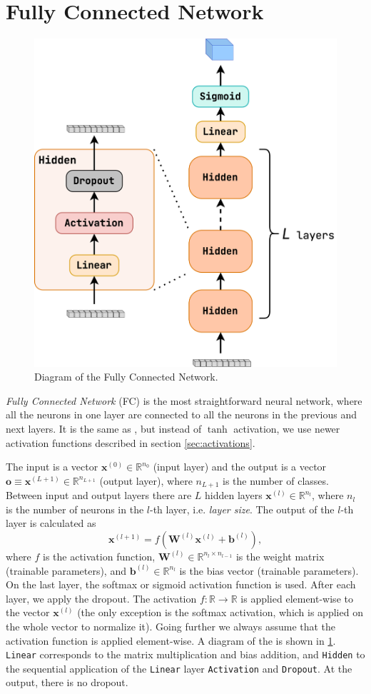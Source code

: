 \section{Fully Connected Network}
\label{sec:fc}
\begin{figure}[htb]
    \centering
    \includegraphics[width=0.6\linewidth]{src/diagrams/fc.png}
    \caption{Diagram of the Fully Connected Network.}
    \label{fig:fc}
\end{figure}

\emph{Fully Connected Network} (FC) \cite{mlp} is the most straightforward neural network, where all the neurons in one layer are connected to all the neurons in the previous and next layers.
It is the same as \mlp \cite{mlp}, but instead of $\tanh$ activation, we use newer activation functions described in section \ref{sec:activations}.

The input is a vector $\pmb{x}^{(0)} \in \mathbb{R}^{n_0}$ (input layer) and the output is a vector $\pmb{o} \equiv \pmb{x}^{(L + 1)} \in \mathbb{R}^{n_{L+1}}$ (output layer), where $n_{L+1}$ is the number of classes.
Between input and output layers there are $L$ hidden layers $\pmb{x}^{(l)} \in \mathbb{R}^{n_{l}}$, where $n_{l}$ is the number of neurons in the $l$-th layer, i.e. \emph{layer size}.
The output of the $l$-th layer is calculated as
\begin{equation}
    \label{eq:hidden}
    \pmb{x}^{(l + 1)} = f(\pmb{W}^{(l)} \pmb{x}^{(l)} + \pmb{b}^{(l)}),
\end{equation}
where $f$ is the activation function, $\pmb{W}^{(l)} \in \mathbb{R}^{n_{l} \times n_{l-1}}$ is the weight matrix (trainable parameters), and $\pmb{b}^{(l)} \in \mathbb{R}^{n_{l}}$ is the bias vector (trainable parameters).
On the last layer, the softmax or sigmoid activation function is used. 
After each layer, we apply the dropout.
The activation $f: \mathbb{R} \rightarrow \mathbb{R}$ is applied element-wise to the vector $\pmb{x}^{(l)}$ (the only exception is the softmax activation, which is applied on the whole vector to normalize it).
Going further we always assume that the activation function is applied element-wise.
A diagram of the \fc is shown in \cref{fig:fc}.
\texttt{Linear} corresponds to the matrix multiplication and bias addition, and \texttt{Hidden} to the sequential application of the \texttt{Linear} layer \texttt{Activation} and \texttt{Dropout}.
At the output, there is no dropout.

